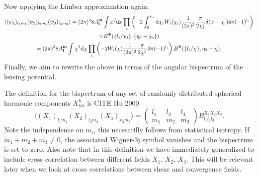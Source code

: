 \documentclass[11pt]{article} %
\DeclareRobustCommand{\d}{\ifmmode\text{d}\else d\fi}
\newcommand{\br}[1]{\ensuremath{\left( #1 \right)}}
\begin{document}
Now applying the Limber approximation again:
\begin{gather*}
    \langle (\psi_1)_{l_1m_1}(\psi_2)_{l_2m_2}(\psi_3)_{l_3m_3} \rangle 
    = (2\pi)^3 8 A_{\mathbf l}^{\mathbf m}\int x^2\d x\prod_i\br{-2\int_0^{\chi_*}\d\chi_i W_i(\chi_i)\frac{1}{(2\pi)^{3}}\frac{\pi}{2\chi_i^2}\delta(x-\chi_i)4\pi (-1)^{l_i}} \\ \times B^\Psi(\{l_i/\chi_i\}, \{\eta_0-\chi_i\}) \\
    = (2\pi)^3 8 A_{\mathbf l}^{\mathbf m}\int \chi^2\d \chi\prod_i\br{-2 W_i(\chi)\frac{1}{(2\pi)^{3}}\frac{\pi}{2\chi^2}4\pi (-1)^{l_i}} B^\Psi(\{l_i/\chi\}, \eta_0-\chi).
\end{gather*}
Finally, we aim to rewrite the above in terms of the angular bispectrum of the lensing potential. 

The definition for the bispectrum of any set of randomly distributed spherical harmonic components $X^k_{lm}$ is CITE Hu 2000 
\begin{equation*}
    \langle (X_1)_{l_1m_1}(X_2)_{l_2m_2}(X_3)_{x_3m_3} \rangle = \begin{pmatrix}
        l_1 & l_2 & l_3 \\ m_1 & m_2 & m_3
    \end{pmatrix}
    B_{l_1l_2l_3}^{X_1X_2X_3}.
\end{equation*}
Note the independence on $m_i$, this necesarilly follows from statistical isotropy. %
If $m_1+m_2+m_3\neq 0$, the associated Wigner-3j symbol vanishes and the bispectrum is set to zero.
Also note that in this definition we have immediately generalized to include cross correlation between different fields $X_1$, $X_2$, $X_3$. This will be relevant later when we look at cross correlations between shear and convergence fields.
\end{document}
